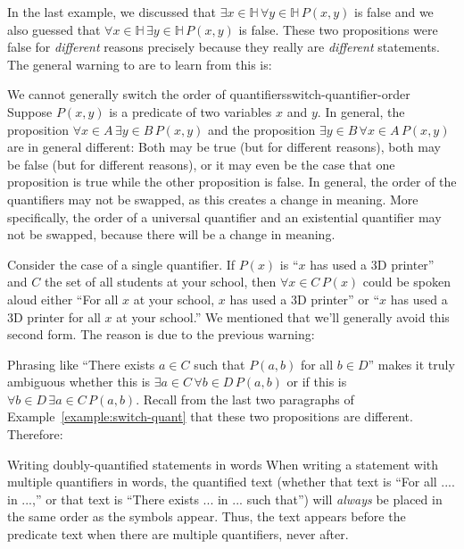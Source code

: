 \documentclass{book}
\theoremstyle{ekimcustom}
\begin{document}
In the last example, we discussed that $\exists x \in \mathbb{H}\,\forall y \in \mathbb{H}\,P(x,y)$ is false and we also guessed that $\forall x \in \mathbb{H}\,\exists y \in \mathbb{H}\,P(x,y)$ is false. These two propositions were false for \emph{different} reasons precisely because they really are \emph{different} statements. The general warning to are to learn from this is:
\begin{bwarning}{We cannot generally switch the order of quantifiers}{switch-quantifier-order}
Suppose $P(x,y)$ is a predicate of two variables $x$ and $y$. In general, the proposition $\forall x \in A\, \exists y \in B\,P(x,y)$ and the proposition $\exists y \in B\,\forall x \in A\,P(x,y)$ are in general different:
\vskip6pt
Both may be true (but for different reasons), both may be false (but for different reasons), or it may even be the case that one proposition is true while the other proposition is false.
\vskip6pt
In general, the order of the quantifiers may not be swapped, as this creates a change in meaning. More specifically, the order of a universal quantifier and an existential quantifier may not be swapped, because there will be a change in meaning.
\end{bwarning}

Consider the case of a single quantifier. If $P(x)$ is ``$x$ has used a 3D printer'' and $C$ the set of all students at your school, then $\forall x \in C\, P(x)$ could be spoken aloud either ``For all $x$ at your school, $x$ has used a 3D printer'' or ``$x$ has used a 3D printer for all $x$ at your school.'' We mentioned that we'll generally avoid this second form. The reason is due to the previous warning:

Phrasing like ``There exists $a \in C$ such that $P(a,b)$ for all $b \in D$'' makes it truly ambiguous whether this is $\exists a \in C\,\forall b \in D \, P(a,b)$ or if this is $\forall b \in D\,\exists a \in C\,P(a,b)$. Recall from the last two paragraphs of Example~\ref{example:switch-quant} that these two propositions are different. Therefore:

\begin{blanguage}{}{Writing doubly-quantified statements in words}
When writing a statement with multiple quantifiers in words, the quantified text (whether that text is ``For all .... in ...,'' or that text is ``There exists ... in ... such that'') will \emph{always} be placed in the same order as the symbols appear. Thus, the text appears before the predicate text when there are multiple quantifiers, never after.
\end{blanguage}
\end{document}
